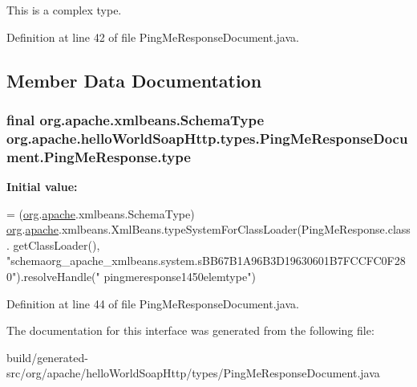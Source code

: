 This is a complex type. 

Definition at line 42 of file Ping\+Me\+Response\+Document.\+java.



\subsection{Member Data Documentation}
\hypertarget{interfaceorg_1_1apache_1_1hello_world_soap_http_1_1types_1_1_ping_me_response_document_1_1_ping_me_response_a1e0a1cc818a306579b621603f4d33db4}{}
\subsubsection[{type}]{\setlength{\rightskip}{0pt plus 5cm}final org.\+apache.\+xmlbeans.\+Schema\+Type org.\+apache.\+hello\+World\+Soap\+Http.\+types.\+Ping\+Me\+Response\+Document.\+Ping\+Me\+Response.\+type\hspace{0.3cm}{\ttfamily [static]}}\label{interfaceorg_1_1apache_1_1hello_world_soap_http_1_1types_1_1_ping_me_response_document_1_1_ping_me_response_a1e0a1cc818a306579b621603f4d33db4}
{\bfseries Initial value\+:}
\begin{DoxyCode}
= (\hyperlink{namespaceorg}{org}.\hyperlink{namespaceorg_1_1apache}{apache}.xmlbeans.SchemaType)
            \hyperlink{namespaceorg}{org}.\hyperlink{namespaceorg_1_1apache}{apache}.xmlbeans.XmlBeans.typeSystemForClassLoader(PingMeResponse.class.
      getClassLoader(), \textcolor{stringliteral}{"schemaorg\_apache\_xmlbeans.system.sBB67B1A96B3D19630601B7FCCFC0F280"}).resolveHandle(\textcolor{stringliteral}{"
      pingmeresponse1450elemtype"})
\end{DoxyCode}


Definition at line 44 of file Ping\+Me\+Response\+Document.\+java.



The documentation for this interface was generated from the following file\+:\begin{DoxyCompactItemize}
\item 
build/generated-\/src/org/apache/hello\+World\+Soap\+Http/types/Ping\+Me\+Response\+Document.\+java\end{DoxyCompactItemize}

